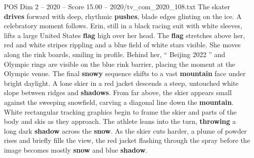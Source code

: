 \begin{textsample}{POS Dim 2 – 2020 – Score 15.00 – 2020/tv\_com\_2020\_108.txt}
The skater \textbf{drives} forward with deep, rhythmic \textbf{pushes}, blade edges glinting on the ice.
A celebratory moment follows.
Erin, still in a black racing suit with white sleeves, lifts a large United States \textbf{flag} high over her head.
The \textbf{flag} stretches above her, red and white stripes rippling and a blue field of white stars visible.
She moves along the rink boards, smiling in profile.
Behind her, “ Beijing 2022 ” and Olympic rings are visible on the blue rink barrier, placing the moment at the Olympic venue.
The final \textbf{snowy} sequence shifts to a vast \textbf{mountain} face under bright daylight.
A lone skier in a red jacket descends a steep, untouched white slope between ridges and \textbf{shadows}.
From far above, the skier appears small against the sweeping snowfield, carving a diagonal line down the \textbf{mountain}.
White rectangular tracking graphics begin to frame the skier and parts of the body and skis as they approach.
The athlete leans into the turn, \textbf{throwing} a long dark \textbf{shadow} across the \textbf{snow}.
As the skier cuts harder, a plume of powder rises and briefly fills the view, the red jacket flashing through the spray before the image becomes mostly \textbf{snow} and blue \textbf{shadow}.

\end{textsample}

